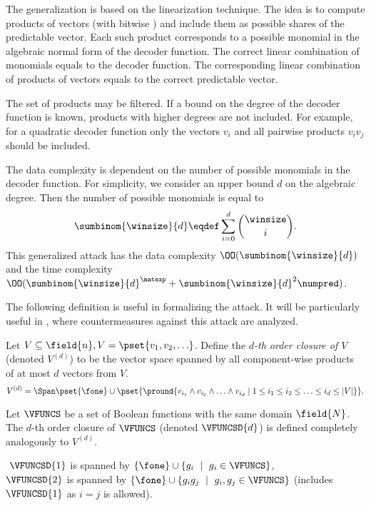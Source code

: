 The generalization is based on the linearization technique. The idea is to compute products of vectors (with bitwise \tand{}) and include them as possible shares of the predictable vector. Each such product corresponds to a possible monomial in the algebraic normal form of the decoder function. The correct linear combination of monomials equals to the decoder function. The corresponding linear combination of products of vectors equals to the correct predictable vector.

The set of products may be filtered. If a bound on the degree of the decoder function is known, products with higher degrees are not included. For example, for a quadratic decoder function only the vectors $v_i$ and all pairwise products $v_iv_j$ should be included.

The data complexity is dependent on the number of possible monomials in the decoder function. For simplicity, we consider an upper bound $d$ on the algebraic degree. Then the number of possible monomials is equal to
$$
\sumbinom{\winsize}{d} \eqdef \sum_{i=0}^d \binom{\winsize}{i}.
$$
This generalized attack has the data complexity $\OO(\sumbinom{\winsize}{d})$ and the time complexity $\OO(\sumbinom{\winsize}{d}^\matexp + \sumbinom{\winsize}{d}^2\numpred)$. 

The following definition is useful in formalizing the attack. It will be particularly useful in , where countermeasures against this attack are analyzed.

\begin{definition}
Let $V \subseteq \field{n}, V = \pset{v_1, v_2, \ldots}$. Define the \emph{$d$-th order closure of $V$} (denoted $V^{(d)}$) to be the vector space spanned by all component-wise products of at most $d$ vectors from $V$.
$$
V^{(d)} = \Span \pset{\fone} \cup \pset{
    \pround{
        v_{i_1}\land v_{i_2} \land \ldots \land v_{i_d}
        \mid
        1 \le i_1 \le i_2 \le \ldots \le i_d \le |V|
    }
}.
$$

Let $\VFUNCS$ be a set of Boolean functions with the same domain $\field{N}$.
The $d$-th order closure of $\VFUNCS$ (denoted $\VFUNCSD{d}$) is defined completely analogously to $V^{(d)}$.
\end{definition}
\begin{example}
$ $\newline
$\VFUNCSD{1}$ is spanned by $\{\fone\}\cup\{g_i ~\mid~ g_i \in \VFUNCS\}$,\\
$\VFUNCSD{2}$ is spanned by $\{\fone\}\cup\{g_ig_j ~\mid~ g_i,g_j \in \VFUNCS\}$ (includes $\VFUNCSD{1}$ as $i=j$ is allowed).                    
\end{example}

